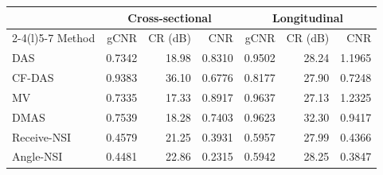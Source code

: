 \begin{tabular}{@{}lrrrrrr@{}}
\toprule
& \multicolumn{3}{c}{Cross-sectional} & \multicolumn{3}{c}{Longitudinal} \\
\cmidrule(lr){2-4}\cmidrule(l){5-7}
Method & gCNR & CR (dB) & CNR & gCNR & CR (dB) & CNR \\
\midrule
DAS & 0.7342 & 18.98 & 0.8310 & 0.9502 & 28.24 & 1.1965 \\
CF-DAS & 0.9383 & 36.10 & 0.6776 & 0.8177 & 27.90 & 0.7248 \\
MV & 0.7335 & 17.33 & 0.8917 & 0.9637 & 27.13 & 1.2325 \\
DMAS & 0.7539 & 18.28 & 0.7403 & 0.9623 & 32.30 & 0.9417 \\
Receive-NSI & 0.4579 & 21.25 & 0.3931 & 0.5957 & 27.99 & 0.4366 \\
Angle-NSI & 0.4481 & 22.86 & 0.2315 & 0.5942 & 28.25 & 0.3847 \\
\bottomrule
\end{tabular}
